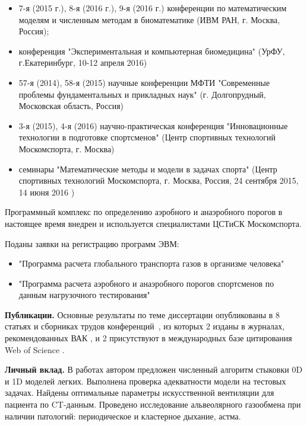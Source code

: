 \noindent
\begin{itemize}
  
  \item 7-я (2015 г.), 8-я (2016 г.), 9-я (2016 г.) конференции по математическим моделям и численным методам в биоматематике (ИВМ РАН, г. Москва, Россия); 
  
  \item конференция "Экспериментальная и компьютерная биомедицина" (УрФУ, г.Екатеринбург, 10-12 апреля 2016)
  
  \item 57-я (2014), 58-я (2015) научные конференции МФТИ "Современные проблемы фундаментальных и прикладных наук" (г. Долгопрудный, Московская область, Россия)
  
  \item 3-я (2015), 4-я (2016) научно-практическая конференция "Инновационные технологии в подготовке спортсменов" (Центр спортивных технологий Москомспорта, г. Москва)
  
  \item семинары "Математические методы и модели в задачах спорта" (Центр спортивных технологий Москомспорта, г. Москва, Россия, 24 сентября 2015, 14 июня 2016 )

\end{itemize}

Программный комплекс по определению аэробного и анаэробного порогов в настоящее время внедрен и используется специалистами ЦСТиСК Москомспорта.

Поданы заявки на регистрацию программ ЭВМ:
\begin{itemize}
    \item "Программа расчета глобального транспорта газов в организме человека"
    \item "Программа расчета аэробного и анаэробного порогов спортсменов по данным нагрузочного тестирования"
\end{itemize}

\textbf{Публикации.} 
Основные результаты по теме диссертации опубликованы в 8 статьях и сборниках трудов конференций~\cite{GolovComp2017, GolovCmodel2017, GolovIt2017,GolovSp2015,GolovSp2016,TimmeSp2016,GolovEkb2016,Simakov2015}, из которых 2 изданы в журналах, рекомендованных ВАК \cite{GolovIt2017, GolovCmodel2017}, и 2 присутствуют в международных базе цитирования Web of Science \cite{GolovComp2017, GolovCmodel2017}.

\textbf{Личный вклад.}
В работах \cite{GolovComp2017,Simakov2015} автором предложен численный алгоритм стыковки 0D и 1D моделей легких. Выполнена проверка адекватности модели на тестовых задачах. Найдены оптимальные параметры искусственной вентиляции для пациента по CT-данным. Проведено исследование альвеолярного газообмена при наличии патологий: периодическое и кластерное дыхание, астма.

